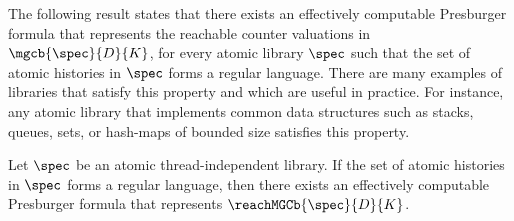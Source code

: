 The following result states that there exists an effectively computable Presburger formula that represents the reachable counter valuations in $\mgcb{\spec}{D}{K}$, for every atomic library $\spec$ such that the set of atomic histories in $\spec$ forms a regular language. There are many examples of libraries that satisfy this property and which are useful in practice. For instance, any atomic library that implements common data structures such as stacks, queues, sets, or hash-maps of bounded size satisfies this property.

\begin{theorem}
Let $\spec$ be an atomic thread-independent library. If the set of atomic histories in $\spec$ forms a regular language, then there exists an effectively computable Presburger formula that represents $\reachMGCb{\spec}{D}{K}$.
\end{theorem}

